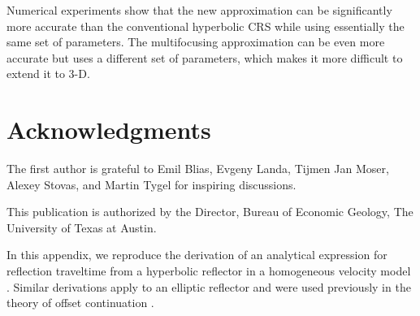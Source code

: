 Numerical experiments show that the new approximation can be
significantly more accurate than the conventional hyperbolic CRS while
using essentially the same set of parameters. The multifocusing
approximation can be even more accurate but uses a different set of
parameters, which makes it more difficult to extend it to 3-D.

\section{Acknowledgments}

The first author is grateful to Emil Blias, Evgeny Landa, Tijmen
Jan Moser, Alexey Stovas, and Martin Tygel for inspiring discussions.

This publication is authorized by the Director, Bureau of Economic
Geology, The University of Texas at Austin.


In this appendix, we reproduce the derivation of an analytical
expression for reflection traveltime from a hyperbolic reflector in a
homogeneous velocity model \cite[]{hyper}. Similar derivations apply
to an elliptic reflector and were used previously in the theory of 
offset continuation \cite[]{stovas,GEO68-02-07180732}.

